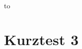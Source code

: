 %
%
%



{\parindent0pt\hbox to}
\vspace{0.5cm}

\section*{Kurztest 3}

\begin{uebungsaufgaben}



\end{uebungsaufgaben}


